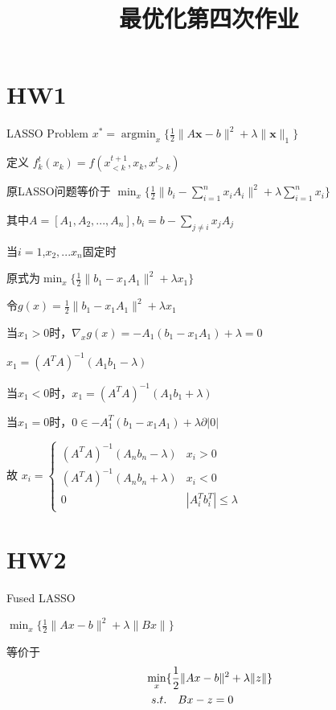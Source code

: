\documentclass{xjtureport}
\title{最优化第四次作业}
\date{\zhtoday}
\begin{document}
\makecover

\makeheader


\section{HW1}
LASSO Problem
$x^* = \mathop{argmin}_{x} \{ \frac{1}{2} \| A\textbf{x} - b \| ^2 + \lambda \| \textbf{x} \|_{1}\}$

定义
$f^{t}_{k}(x_{k}) = f(x^{t+1}_{<k},x_{k},x^{t}_{>k})$

原LASSO问题等价于
$\mathop{\min}_{x} \{\frac{1}{2} \|b_i - \sum_{i =1}^{n} x_iA_i \| ^2+ \lambda \sum_{i=1}^{n}x_i\}$

其中$A = [A_1,A_2,...,A_n], b_i = b - \sum_{j \neq i} x_jA_j$

当$i = 1$,$x_2,...x_n$固定时

原式为$\mathop{\min}_{x} \{ \frac{1}{2} \|b_1 -  x_1A_1 \|^2 + \lambda  x_1 \}$

令$g(x) =\frac{1}{2} \|b_1 -  x_1A_1 \|^2 + \lambda x_1 $\

当$x_1 > 0$时，$\nabla_x g(x) = -A_1(b_1 - x_1A_1) + \lambda = 0$

$x_1 = (A^TA)^{-1}(A_1b_1 - \lambda)$

当$x_1 < 0$时，$x_1 = (A^TA)^{-1}(A_1b_1 + \lambda)$

当$x_1 = 0$时，$0 \in -A^T_1(b_1 - x_1A_1) + \lambda \partial |0|$

故
$x_i = \left\{\begin{matrix}
    (A^TA)^{-1}(A_nb_n - \lambda)  & x_i > 0\\ 
    (A^TA)^{-1}(A_nb_n + \lambda)&  x_i < 0 \\ 
    0&|A_i^Tb_i^T| \leq \lambda 
   \end{matrix}\right.$
\section{HW2}
Fused LASSO

$\mathop{\min}_{x}\{ \frac{1}{2} \|Ax - b  \|^2 + \lambda \|Bx\|\}$

等价于
\begin{equation}
    \begin{aligned} \label{P}
        & \mathop{\min}_{x}\{ \frac{1}{2} \|Ax - b  \|^2 + \lambda \|z\|\}\\
        &\begin{array}[]{r@{\quad}r@{}l@{\quad}l}
        s.t.& Bx - z = 0\\
        \end{array}
    \end{aligned}
\end{equation}
\end{document}
